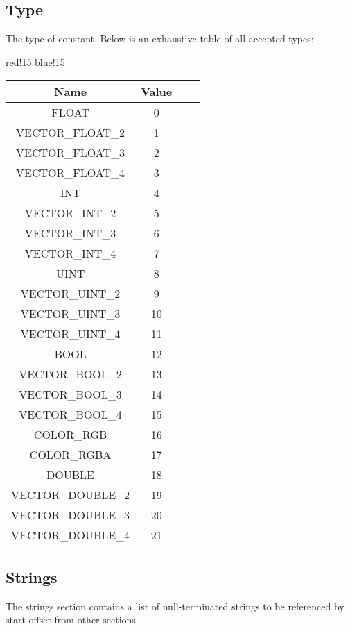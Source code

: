 \subsection{Type}
The type of constant. Below is an exhaustive table of all accepted types:
\begin{center}
    {
        {red!15}
        {blue!15}
        \begin{tabular}{|c|c|c|c|}
            \hline
            \textbf{Name} & \textbf{Value} \\

            \hline\hline
            FLOAT & 0 \\
            VECTOR\_FLOAT\_2 & 1 \\
            VECTOR\_FLOAT\_3 & 2 \\
            VECTOR\_FLOAT\_4 & 3 \\
            INT & 4 \\
            VECTOR\_INT\_2 & 5 \\
            VECTOR\_INT\_3 & 6 \\
            VECTOR\_INT\_4 & 7 \\
            UINT & 8 \\
            VECTOR\_UINT\_2 & 9 \\
            VECTOR\_UINT\_3 & 10 \\
            VECTOR\_UINT\_4 & 11 \\
            BOOL & 12 \\
            VECTOR\_BOOL\_2 & 13 \\
            VECTOR\_BOOL\_3 & 14 \\
            VECTOR\_BOOL\_4 & 15 \\
            COLOR\_RGB & 16 \\
            COLOR\_RGBA & 17 \\
            DOUBLE & 18 \\
            VECTOR\_DOUBLE\_2 & 19 \\
            VECTOR\_DOUBLE\_3 & 20 \\
            VECTOR\_DOUBLE\_4 & 21 \\
            \hline
        \end{tabular}
    }
\end{center}

\subsection{Strings}
The strings section contains a list of null-terminated strings to be referenced by start offset from other sections.